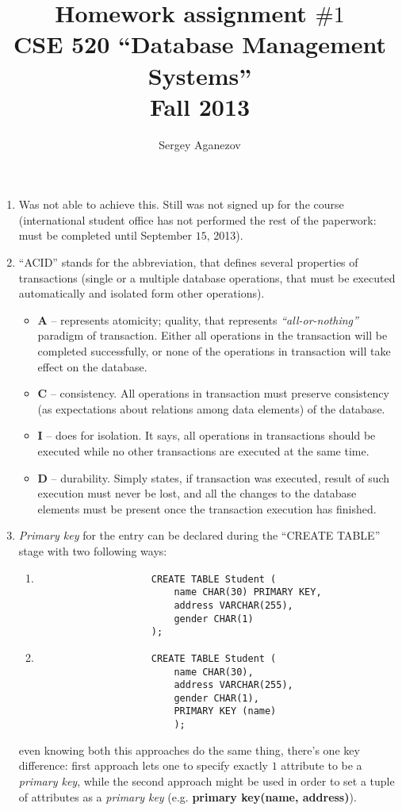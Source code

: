 \documentclass[a4paper,11pt]{article}
\author{Sergey Aganezov}
\title{Homework assignment $\#1$ \\ CSE 520 ``Database Management Systems'' \\ Fall 2013}
\begin{document}
	\maketitle
	\begin{enumerate}
		\item Was not able to achieve this. Still was not signed up for the course (international student office has not performed the rest of the paperwork: must be completed until September $15$, 2013).
		\item ``ACID'' stands for the abbreviation, that defines several properties of transactions (single or a multiple database operations, that must be executed automatically and isolated form other operations).
		\begin{itemize}
			\item \textbf{A} -- represents atomicity; quality, that represents \emph{``all-or-nothing''} paradigm of transaction. Either all operations in the transaction will be completed successfully, or none of the operations in transaction will take effect on the database.
			\item \textbf{C} -- consistency. All operations in transaction must preserve consistency (as expectations about relations among data elements) of the database.
			\item \textbf{I} -- does for isolation. It says, all operations in transactions should be executed while no other transactions are executed at the same time.
			\item \textbf{D} -- durability. Simply states, if transaction was executed, result of such execution must never be lost, and all the changes to the database elements must be present once the transaction execution has finished.
		\end{itemize}
		\item \emph{Primary key} for the entry can be declared during the ``CREATE TABLE'' stage with two following ways:
		
			
		
		
		\begin{enumerate}
			\item 	\begin{verbatim}
					CREATE TABLE Student (
					    name CHAR(30) PRIMARY KEY,
					    address VARCHAR(255),
					    gender CHAR(1)
					);
					\end{verbatim}	
			\item   \begin{verbatim}
					CREATE TABLE Student (
					    name CHAR(30),
					    address VARCHAR(255),
					    gender CHAR(1),
					    PRIMARY KEY (name)
						);	
					\end{verbatim}
		\end{enumerate}
		even knowing both this approaches do the same thing, there's one key difference: first approach lets one to specify exactly \textbf{$1$} attribute to be a \emph{primary key}, while the second approach might be used in order to set a tuple of attributes as a \emph{primary key} (e.g. \textbf{primary key(name, address)}).


\end{enumerate}
\end{document}
